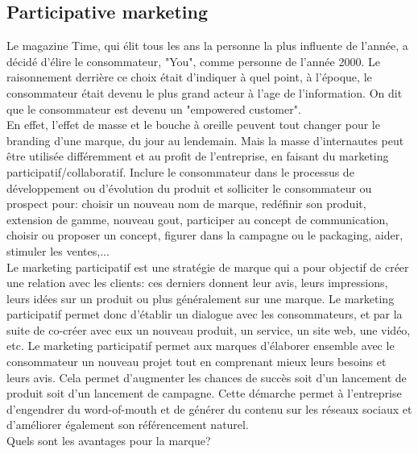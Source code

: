 \vspace{-1.2cm}

\subsection{Participative marketing}

Le magazine Time, qui élit tous les ans la personne la plus influente de l'année, a décidé d'élire le consommateur, "You", comme personne de l'année 2000. Le raisonnement derrière ce choix était d'indiquer à quel point, à l'époque, le consommateur était devenu le plus grand acteur à l'age de l'information. On dit que le consommateur est devenu un "empowered customer".\\

En effet, l'effet de masse et le bouche à oreille peuvent tout changer pour le branding d'une marque, du jour au lendemain. Mais la masse d'internautes peut être utilisée différemment et au profit de l'entreprise, en faisant du marketing participatif/collaboratif. Inclure le consommateur dans le processus de développement ou d'évolution du produit et solliciter le consommateur ou prospect pour: choisir un nouveau nom de marque, redéfinir son produit, extension de gamme, nouveau gout, participer au concept de communication, choisir ou proposer un concept, figurer dans la campagne ou le packaging, aider, stimuler les ventes,...\\

Le marketing participatif est une stratégie de marque qui a pour objectif de créer une relation avec les clients: ces derniers donnent leur avis, leurs impressions, leurs idées sur un produit ou plus généralement sur une marque. Le marketing participatif permet donc d'établir un dialogue avec les consommateurs, et par la suite de co-créer avec eux un nouveau produit, un service, un site web, une vidéo, etc. Le marketing participatif permet aux marques d'élaborer ensemble avec le consommateur un nouveau projet tout en comprenant mieux leurs besoins et leurs avis. Cela permet d'augmenter les chances de succès soit d'un lancement de produit soit d'un lancement de campagne. Cette démarche permet à l'entreprise d'engendrer du word-of-mouth et de générer du contenu sur les réseaux sociaux et d'améliorer également son référencement naturel. \\

Quels sont les avantages pour la marque?

